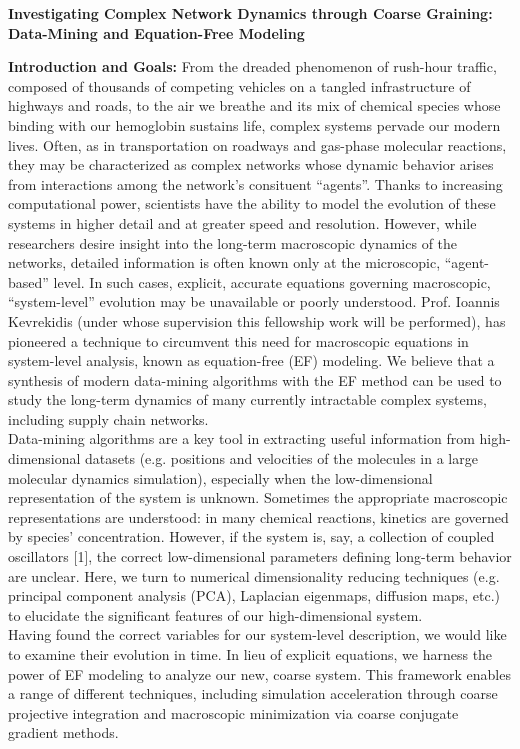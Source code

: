\documentclass[11pt]{article}
\begin{document}
\noindent \textbf{Investigating Complex Network Dynamics through Coarse Graining: Data-Mining and Equation-Free Modeling}

\textbf{Introduction and Goals:} From the dreaded phenomenon of rush-hour traffic, composed of thousands of competing vehicles on a tangled infrastructure of highways and roads, to the air we breathe and its mix of chemical species whose binding with our hemoglobin sustains life, complex systems pervade our modern lives. Often, as in transportation on roadways and gas-phase molecular reactions, they may be characterized as complex networks whose dynamic behavior arises from interactions among the network's consituent ``agents''. Thanks to increasing computational power, scientists have the ability to model the evolution of these systems in higher detail and at greater speed and resolution. However, while researchers desire insight into the long-term macroscopic dynamics of the networks, detailed information is often known only at the microscopic, ``agent-based'' level. In such cases, explicit, accurate equations governing macroscopic, “system-level” evolution may be unavailable or poorly understood. Prof. Ioannis Kevrekidis (under whose supervision this fellowship work will be performed), has pioneered a technique to circumvent this need for macroscopic equations in system-level analysis, known as equation-free (EF) modeling. We believe that a synthesis of modern data-mining algorithms with the EF method can be used to study the long-term dynamics of many currently intractable complex systems, including supply chain networks.\\
\indent Data-mining algorithms are a key tool in extracting useful information from high-dimensional datasets (e.g. positions and velocities of the molecules in a large molecular dynamics simulation), especially when the low-dimensional representation of the system is unknown. Sometimes the appropriate macroscopic representations are understood: in many chemical reactions, kinetics are governed by species' concentration. However, if the system is, say, a collection of coupled oscillators [1], the correct low-dimensional parameters defining long-term behavior are unclear. Here, we turn to numerical dimensionality reducing techniques (e.g. principal component analysis (PCA), Laplacian eigenmaps, diffusion maps, etc.) to elucidate the significant features of our high-dimensional system.\\
\indent Having found the correct variables for our system-level description, we would like to examine their evolution in time. In lieu of explicit equations, we harness the power of EF modeling to analyze our new, coarse system. This framework enables a range of different techniques, including simulation acceleration through coarse projective integration and macroscopic minimization via coarse conjugate gradient methods.\\
\end{document}
